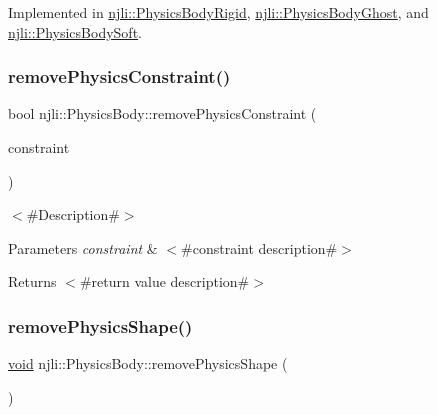Implemented in \mbox{\hyperlink{classnjli_1_1_physics_body_rigid_a7efbdfc46e8df26d073b00efaaf0c91c}{njli\+::\+Physics\+Body\+Rigid}}, \mbox{\hyperlink{classnjli_1_1_physics_body_ghost_a854f866870a887026cfb87d441008595}{njli\+::\+Physics\+Body\+Ghost}}, and \mbox{\hyperlink{classnjli_1_1_physics_body_soft_adce1993fe1287488cc5cb42b30a09bcc}{njli\+::\+Physics\+Body\+Soft}}.

\mbox{\label{classnjli_1_1_physics_body_a45058a03979e89b0b0fc4dceb07d8b4d}} 
\subsubsection{\texorpdfstring{remove\+Physics\+Constraint()}{removePhysicsConstraint()}}
{\footnotesize\ttfamily bool njli\+::\+Physics\+Body\+::remove\+Physics\+Constraint (\begin{DoxyParamCaption}\item[{\mbox{\hyperlink{classnjli_1_1_physics_constraint}{Physics\+Constraint}} $\ast$}]{constraint }\end{DoxyParamCaption})\hspace{0.3cm}{\ttfamily [protected]}}

$<$\#\+Description\#$>$


\begin{DoxyParams}{Parameters}
{\em constraint} & $<$\#constraint description\#$>$\\
\hline
\end{DoxyParams}
\begin{DoxyReturn}{Returns}
$<$\#return value description\#$>$ 
\end{DoxyReturn}
\mbox{\label{classnjli_1_1_physics_body_a5ecb49baeaa8c38937ee5fc566702148}} 
\subsubsection{\texorpdfstring{remove\+Physics\+Shape()}{removePhysicsShape()}}
{\footnotesize\ttfamily \mbox{\hyperlink{_thread_8h_af1e856da2e658414cb2456cb6f7ebc66}{void}} njli\+::\+Physics\+Body\+::remove\+Physics\+Shape (\begin{DoxyParamCaption}{ }\end{DoxyParamCaption})}

